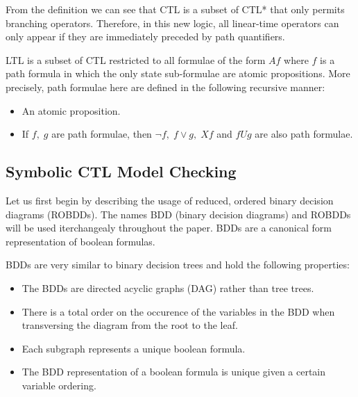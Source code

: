 \documentclass[11pt]{article}
\begin{document}
        From the definition we can see that CTL is a subset of CTL* that only permits
        branching operators. Therefore, in this new logic, all linear-time operators
        can only appear if they are immediately preceded by path quantifiers.

        \begin{definition}
            LTL is a subset of CTL restricted to all formulae of the form $Af$ where
            $f$ is a path formula in which the only state sub-formulae are atomic
            propositions\cite{ltl}.
            More precisely, path formulae here are defined in the following recursive
            manner:
            \begin{itemize}
                \item
                    An atomic proposition.
                \item
                    If $f,\; g$ are path formulae, then $\neg f,\; f\vee g,\;
                    Xf$ and $fUg$ are also path formulae.
            \end{itemize}
        \end{definition}


    \subsection{Symbolic CTL Model Checking}
        Let us first begin by describing the usage of reduced, ordered 
        binary decision diagrams (ROBDDs). The names BDD
        (binary decision diagrams) and ROBDDs will be used iterchangealy
        throughout the paper. BDDs are a canonical form representation of
        boolean formulas\cite{bdd}.

        BDDs are very similar to binary decision trees and hold the following
        properties:
        \begin{itemize}
            \item 
                The BDDs are directed acyclic graphs (DAG) rather than tree
                trees.
            \item
                There is a total order on the occurence of the variables in the
                BDD when transversing the diagram from the root to the leaf.

            \item
                Each subgraph represents a unique boolean formula.
            
            \item
                The BDD representation of a boolean formula is unique given
                a certain variable ordering.
        \end{itemize}
\end{document}
